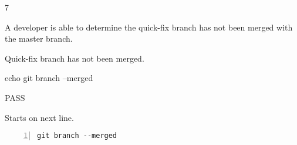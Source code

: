 \begin{description}[align=right,leftmargin=3.2cm,labelindent=3.0cm]
\item[Step:] 7
\item[Confirm:] A developer is able to determine the quick-fix branch has not been merged with the master branch.
\item[Expectation:] Quick-fix branch has not been merged.
\item[Command:] echo git  branch --merged
\item[Test Result:] PASS
\item[Evidence:] Starts on next line.
\end{description}
\begin{lstlisting}[numbers=left]
git branch --merged

\end{lstlisting}
